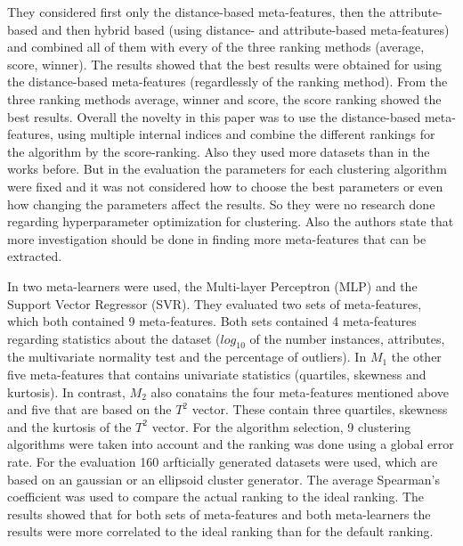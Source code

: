 They considered first only the distance-based meta-features, then the attribute-based and then hybrid based (using distance- and attribute-based meta-features) and combined all of them with every of the three ranking methods (average, score, winner).
The results showed that the best results were obtained for using the distance-based meta-features (regardlessly of the ranking method).
From the three ranking methods average, winner and score, the score ranking showed the best results.
Overall the novelty in this paper was to use the distance-based meta-features, using multiple internal indices and combine the different rankings for the algorithm by the score-ranking. 
Also they used more datasets than in the works before.
But in the evaluation the parameters for each clustering algorithm were fixed and it was not considered how to choose the best parameters or even how changing the parameters affect the results.
So they were no research done regarding hyperparameter optimization for clustering.
Also the authors state that more investigation should be done in finding more meta-features that can be extracted.

In \cite{Soares2009AnData} two meta-learners were used, the Multi-layer Perceptron (MLP) and the Support Vector Regressor (SVR).
They evaluated two sets of meta-features, which both contained 9 meta-features.
Both sets contained 4 meta-features regarding statistics about the dataset ($log_10$ of the number instances, attributes, the multivariate normality test and the percentage of outliers).
In $M_1$ the other five meta-features that contains univariate statistics (quartiles, skewness and kurtosis). 
In contrast, $M_2$ also conatains the four meta-features mentioned above and five that are based on the $T^2$ vector.
These contain three quartiles, skewness and the kurtosis of the $T^2$ vector.
For the algorithm selection, 9 clustering algorithms were taken into account and the ranking was done using a global error rate.
For the evaluation 160 arfticially generated datasets were used, which are based on an gaussian or an ellipsoid cluster generator.
The average Spearman's coefficient was used to compare the actual ranking to the ideal ranking.
The results showed that for both sets of meta-features and both meta-learners the results were more correlated to the ideal ranking than for the default ranking.

